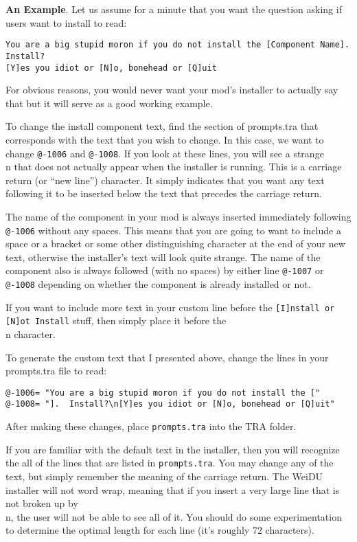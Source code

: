 \documentclass{article}
\def\t#1{{\tt #1}}
\begin{document}
{\bf An Example}. 
Let us assume for a minute that you want the question asking if users want
to install to read:
\begin{verbatim}
You are a big stupid moron if you do not install the [Component Name].
Install?
[Y]es you idiot or [N]o, bonehead or [Q]uit
\end{verbatim}

For obvious reasons, you would never want your mod's installer to
actually say that but it will serve as a good working example.

To change the install component text, find the section of prompts.tra that
corresponds with the text that you wish to change.  In this case, we want
to change \t{@-1006} and \t{@-1008}.  If you look at these lines, you will
see a strange \\n that does not actually appear when the installer is
running.  This is a carriage return (or ``new line'') character.  It simply
indicates that you want any text following it to be inserted below the text
that precedes the carriage return.

The name of the component in your mod is always inserted immediately
following \t{@-1006} without any spaces.  This means that you are going to
want to include a space or a bracket or some other distinguishing character
at the end of your new text, otherwise the installer's text will look
quite strange.  The name of the component also is always followed (with no
spaces) by either line \t{@-1007} or \t{@-1008} depending on whether the
component is already installed or not.

If you want to include more text in your custom line before the \t{[I]nstall or
[N]ot Install} stuff, then simply place it before the \\n character.

To generate the custom text that I presented above, change the lines in
your prompts.tra file to read:
\begin{verbatim}
@-1006= "You are a big stupid moron if you do not install the ["
@-1008= "].  Install?\n[Y]es you idiot or [N]o, bonehead or [Q]uit"
\end{verbatim}

After making these changes, place \t{prompts.tra} into the TRA folder.

If you are familiar with the default text in the installer, then you will
recognize the all of the lines that are listed in \t{prompts.tra}.  You may
change any of the text, but simply remember the meaning of the carriage
return.  The WeiDU installer will not word wrap, meaning that if you insert
a very large line that is not broken up by \\n, the user will not be able
to see all of it.  You should do some experimentation to determine the
optimal length for each line (it's roughly 72 characters).
\end{document}
